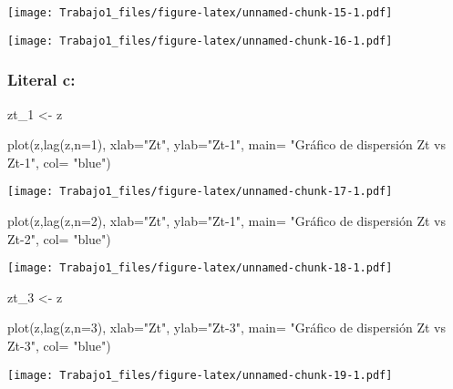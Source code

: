 \documentclass[
]{article}
\newenvironment{Shaded}{\begin{snugshade}}{\end{snugshade}}
\newcommand{\AttributeTok}[1]{\textcolor[rgb]{0.77,0.63,0.00}{#1}}
\newcommand{\DecValTok}[1]{\textcolor[rgb]{0.00,0.00,0.81}{#1}}
\newcommand{\FunctionTok}[1]{\textcolor[rgb]{0.00,0.00,0.00}{#1}}
\newcommand{\NormalTok}[1]{#1}
\newcommand{\OtherTok}[1]{\textcolor[rgb]{0.56,0.35,0.01}{#1}}
\newcommand{\SpecialCharTok}[1]{\textcolor[rgb]{0.00,0.00,0.00}{#1}}
\newcommand{\StringTok}[1]{\textcolor[rgb]{0.31,0.60,0.02}{#1}}
\begin{document}
\texttt{[image: Trabajo1\_files/figure-latex/unnamed-chunk-15-1.pdf]}

\begin{Shaded}
\end{Shaded}

\texttt{[image: Trabajo1\_files/figure-latex/unnamed-chunk-16-1.pdf]}

\hypertarget{literal-c-1}{%
\subsubsection{Literal c:}\label{literal-c-1}}

\begin{Shaded}
\begin{Highlighting}[]
\NormalTok{zt\_1 }\OtherTok{\textless{}{-}}\NormalTok{ z}

\FunctionTok{plot}\NormalTok{(z,}\FunctionTok{lag}\NormalTok{(z,}\AttributeTok{n=}\DecValTok{1}\NormalTok{), }\AttributeTok{xlab=}\StringTok{"Zt"}\NormalTok{, }\AttributeTok{ylab=}\StringTok{"Zt{-}1"}\NormalTok{, }\AttributeTok{main=} \StringTok{"Gráfico de dispersión Zt vs Zt{-}1"}\NormalTok{, }\AttributeTok{col=} \StringTok{"blue"}\NormalTok{)}
\end{Highlighting}
\end{Shaded}

\texttt{[image: Trabajo1\_files/figure-latex/unnamed-chunk-17-1.pdf]}

\begin{Shaded}
\begin{Highlighting}[]
\FunctionTok{plot}\NormalTok{(z,}\FunctionTok{lag}\NormalTok{(z,}\AttributeTok{n=}\DecValTok{2}\NormalTok{), }\AttributeTok{xlab=}\StringTok{"Zt"}\NormalTok{, }\AttributeTok{ylab=}\StringTok{"Zt{-}1"}\NormalTok{, }\AttributeTok{main=} \StringTok{"Gráfico de dispersión Zt vs Zt{-}2"}\NormalTok{, }\AttributeTok{col=} \StringTok{"blue"}\NormalTok{)}
\end{Highlighting}
\end{Shaded}

\texttt{[image: Trabajo1\_files/figure-latex/unnamed-chunk-18-1.pdf]}

\begin{Shaded}
\begin{Highlighting}[]
\NormalTok{zt\_3 }\OtherTok{\textless{}{-}}\NormalTok{ z}


\FunctionTok{plot}\NormalTok{(z,}\FunctionTok{lag}\NormalTok{(z,}\AttributeTok{n=}\DecValTok{3}\NormalTok{), }\AttributeTok{xlab=}\StringTok{"Zt"}\NormalTok{, }\AttributeTok{ylab=}\StringTok{"Zt{-}3"}\NormalTok{, }\AttributeTok{main=} \StringTok{"Gráfico de dispersión Zt vs Zt{-}3"}\NormalTok{, }\AttributeTok{col=} \StringTok{"blue"}\NormalTok{)}
\end{Highlighting}
\end{Shaded}

\texttt{[image: Trabajo1\_files/figure-latex/unnamed-chunk-19-1.pdf]}
\end{document}
